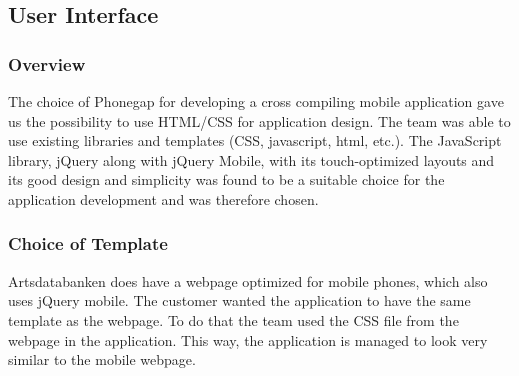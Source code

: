 \subsection{User Interface}
\subsubsection{Overview}
The choice of Phonegap for developing a cross compiling mobile application gave us the possibility to use HTML/CSS for application design. The team was able to use existing libraries and templates (CSS, javascript, html, etc.).
The JavaScript library, jQuery along with jQuery Mobile, with its touch-optimized layouts and its good design and simplicity was found to be a suitable choice for the application development and was therefore chosen.

\subsubsection{Choice of Template}
Artsdatabanken does have a webpage optimized for mobile phones, which also uses jQuery mobile. The customer wanted the application to have the same template as the webpage. To do that the team used the CSS file from the webpage in the application. This way, the application is managed to look very similar to the mobile webpage.

